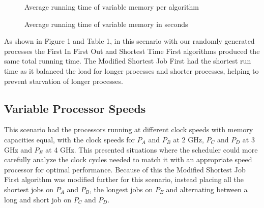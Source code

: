 \documentclass[12pt]{article}
\begin{document}
  \begin{figure}[h!]\CenterFloatBoxes
  \begin{floatrow}
    {\caption{Average running time of variable memory per algorithm}}
    \killfloatstyle{}
    {\caption{Average running time of variable memory in seconds}}
  \end{floatrow}
  \end{figure}

  As shown in Figure 1 and Table 1, in this scenario with our randomly generated processes the First In First Out and Shortest Time First algorithms produced the same total running time. The Modified Shortest Job First had the shortest run time as it balanced the load for longer processes and shorter processes, helping to prevent starvation of longer processes.

  \newpage
  \subsection{Variable Processor Speeds}

  This scenario had the processors running at different clock speeds with memory capacities equal, with the clock speeds for $P_A$ and $P_B$ at 2 GHz, $P_C$ and $P_D$ at 3 GHz and $P_E$ at 4 GHz. This presented situations where the scheduler could more carefully analyze the clock cycles needed to match it with an appropriate speed processor for optimal performance. Because of this the Modified Shortest Job First algorithm was modified further for this scenario, instead placing all the shortest jobs on $P_A$ and $P_B$, the longest jobs on $P_E$ and alternating between a long and short job on $P_C$ and $P_D$.
\end{document}
